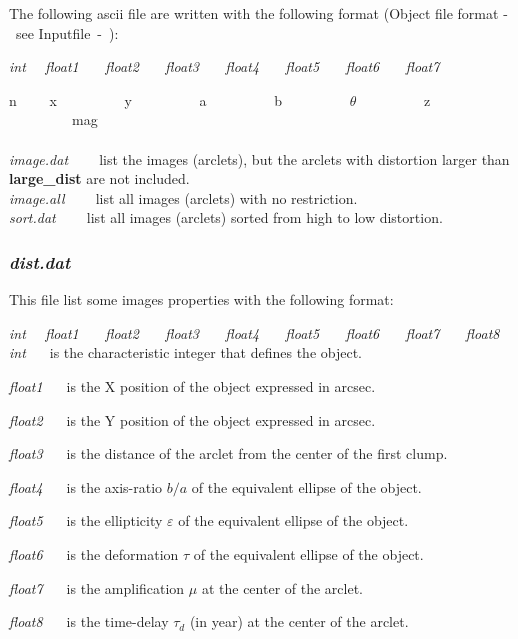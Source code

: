 The following  ascii file are written with the following format
(Object file format -~see Inputfile~-~):

{\sl int \ \  float1 \ \ \ float2 \ \ \ float3 \ \ \ float4
\ \ \ float5 \ \ \ float6 \ \ \ float7}

n \ \ \ \ x \ \ \ \ \ \ \ \ \ y \ \ \ \ \ \ \ \ \ a \ \ \ \ \ \ \ \ \ 
b \ \ \ \ \ \ \ \ \ $\theta$ \ \ \ \ \ \ \ \ \ z \ \ \ \ \ \ \ \ \ mag\\
\\


{\sl image.dat \ \ \ } list the images (arclets), but the arclets
with distortion larger than {\bf large{\_}dist } are not included.\\

{\sl image.all \ \ \ } list all images (arclets) with no restriction.\\

{\sl sort.dat \ \ \ } list all images (arclets) sorted from high to low
distortion.

\subsubsection{\sl dist.dat \ \ \ }

This file list some images properties with the following format:

{\sl int \ \  float1 \ \ \ float2 \ \ \ float3 \ \ \ float4
\ \ \ float5 \ \ \ float6 \ \ \ float7 \ \ \ float8}\\

{\sl int \ \ } is the characteristic integer that defines the object.

{\sl float1 \ \ } is the X position of the object expressed in arcsec.

{\sl float2 \ \ } is the Y position of the object expressed in arcsec.

{\sl float3 \ \ } is the distance of the arclet from the center of the first
clump.

{\sl float4 \ \ } is the axis-ratio $b/a$ of the equivalent ellipse of the 
object.

{\sl float5 \ \ } is the ellipticity $\varepsilon$ of the equivalent
ellipse of the object.

{\sl float6 \ \ } is the deformation $\tau$ of the equivalent
ellipse of the object.

{\sl float7 \ \ } is the amplification $\mu$ at the center of the arclet.

{\sl float8 \ \ } is the time-delay $\tau_d$ (in year) 
at the center of the arclet.


